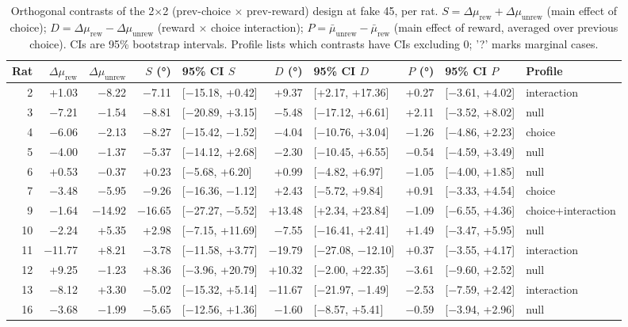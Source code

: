 \begin{table}[htbp]
  \centering
  \caption{Orthogonal contrasts of the 2$\times$2 (prev-choice $\times$ prev-reward) design at fake 45\textdegree, per rat. $S = \Delta\mu_{\mathrm{rew}} + \Delta\mu_{\mathrm{unrew}}$ (main effect of choice); $D = \Delta\mu_{\mathrm{rew}} - \Delta\mu_{\mathrm{unrew}}$ (reward $\times$ choice interaction); $P = \bar\mu_{\mathrm{unrew}} - \bar\mu_{\mathrm{rew}}$ (main effect of reward, averaged over previous choice). CIs are 95\% bootstrap intervals. Profile lists which contrasts have CIs excluding 0; '?' marks marginal cases.}
  \label{tab:orthogonal_contrasts}
  \begin{tabular}{rrrrlrlrll}
    \toprule
    Rat & $\Delta\mu_{\mathrm{rew}}$ & $\Delta\mu_{\mathrm{unrew}}$ & $S$ (°) & 95\% CI $S$ & $D$ (°) & 95\% CI $D$ & $P$ (°) & 95\% CI $P$ & Profile \\
    \midrule
    2 & +1.03 & −8.22 & −7.11 & [−15.18, +0.42] & +9.37 & [+2.17, +17.36] & +0.27 & [−3.61, +4.02] & interaction \\
    3 & −7.21 & −1.54 & −8.81 & [−20.89, +3.15] & −5.48 & [−17.12, +6.61] & +2.11 & [−3.52, +8.02] & null \\
    4 & −6.06 & −2.13 & −8.27 & [−15.42, −1.52] & −4.04 & [−10.76, +3.04] & −1.26 & [−4.86, +2.23] & choice \\
    5 & −4.00 & −1.37 & −5.37 & [−14.12, +2.68] & −2.30 & [−10.45, +6.55] & −0.54 & [−4.59, +3.49] & null \\
    6 & +0.53 & −0.37 & +0.23 & [−5.68, +6.20] & +0.99 & [−4.82, +6.97] & −1.05 & [−4.00, +1.85] & null \\
    7 & −3.48 & −5.95 & −9.26 & [−16.36, −1.12] & +2.43 & [−5.72, +9.84] & +0.91 & [−3.33, +4.54] & choice \\
    9 & −1.64 & −14.92 & −16.65 & [−27.27, −5.52] & +13.48 & [+2.34, +23.84] & −1.09 & [−6.55, +4.36] & choice+interaction \\
    10 & −2.24 & +5.35 & +2.98 & [−7.15, +11.69] & −7.55 & [−16.41, +2.41] & +1.49 & [−3.47, +5.95] & null \\
    11 & −11.77 & +8.21 & −3.78 & [−11.58, +3.77] & −19.79 & [−27.08, −12.10] & +0.37 & [−3.55, +4.17] & interaction \\
    12 & +9.25 & −1.23 & +8.36 & [−3.96, +20.79] & +10.32 & [−2.00, +22.35] & −3.61 & [−9.60, +2.52] & null \\
    13 & −8.12 & +3.30 & −5.02 & [−15.32, +5.14] & −11.67 & [−21.97, −1.49] & −2.53 & [−7.59, +2.42] & interaction \\
    16 & −3.68 & −1.99 & −5.65 & [−12.56, +1.36] & −1.60 & [−8.57, +5.41] & −0.59 & [−3.94, +2.96] & null \\
    \bottomrule
  \end{tabular}
\end{table}
